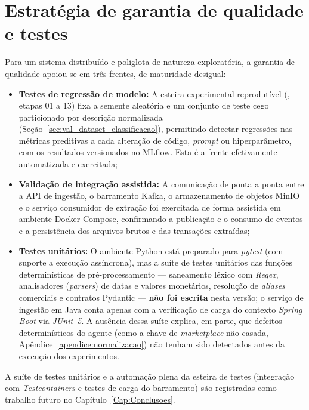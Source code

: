 \section{Estratégia de garantia de qualidade e testes}
\label{sec:sol_testes}

Para um sistema distribuído e poliglota de natureza exploratória, a garantia de qualidade apoiou-se em três frentes, de maturidade desigual:

\begin{itemize}
	\item \textbf{Testes de regressão de modelo:} A esteira experimental reprodutível (, etapas 01 a 13) fixa a semente aleatória e um conjunto de teste cego particionado por descrição normalizada (Seção~\ref{sec:val_dataset_classificacao}), permitindo detectar regressões nas métricas preditivas a cada alteração de código, \textit{prompt} ou hiperparâmetro, com os resultados versionados no MLflow. Esta é a frente efetivamente automatizada e exercitada;
	\item \textbf{Validação de integração assistida:} A comunicação de ponta a ponta entre a API de ingestão, o barramento Kafka, o armazenamento de objetos MinIO e o serviço consumidor de extração foi exercitada de forma assistida em ambiente Docker Compose, confirmando a publicação e o consumo de eventos e a persistência dos arquivos brutos e das transações extraídas;
	\item \textbf{Testes unitários:} O ambiente Python está preparado para \textit{pytest} (com suporte a execução assíncrona), mas a suíte de testes unitários das funções determinísticas de pré-processamento --- saneamento léxico com \textit{Regex}, analisadores (\textit{parsers}) de datas e valores monetários, resolução de \textit{aliases} comerciais e contratos Pydantic --- \textbf{não foi escrita} nesta versão; o serviço de ingestão em Java conta apenas com a verificação de carga do contexto \textit{Spring Boot} via \textit{JUnit~5}. A ausência dessa suíte explica, em parte, que defeitos determinísticos do agente (como a chave de \textit{marketplace} não casada, Apêndice~\ref{apendice:normalizacao}) não tenham sido detectados antes da execução dos experimentos.
\end{itemize}

A suíte de testes unitários e a automação plena da esteira de testes (integração com \textit{Testcontainers} e testes de carga do barramento) são registradas como trabalho futuro no Capítulo~\ref{Cap:Conclusoes}.

